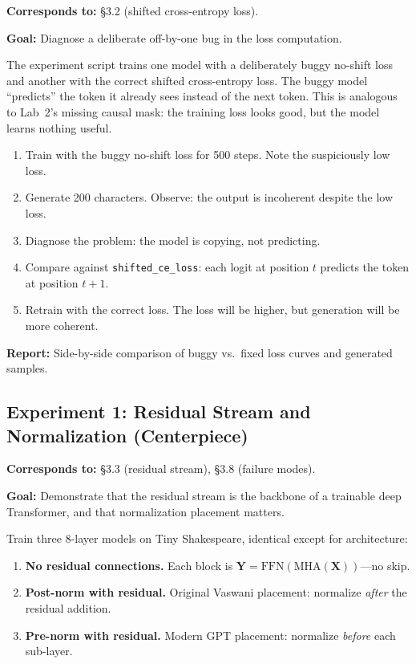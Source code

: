 \textbf{Corresponds to:} \S3.2 (shifted cross-entropy loss).

\textbf{Goal:} Diagnose a deliberate off-by-one bug in the loss computation.

The experiment script trains one model with a deliberately buggy no-shift loss and another with the correct shifted cross-entropy loss. The buggy model ``predicts'' the token it already sees instead of the next token. This is analogous to Lab~2's missing causal mask: the training loss looks good, but the model learns nothing useful.

\begin{enumerate}[nosep]
    \item Train with the buggy no-shift loss for 500 steps. Note the suspiciously low loss.
    \item Generate 200 characters. Observe: the output is incoherent despite the low loss.
    \item Diagnose the problem: the model is copying, not predicting.
    \item Compare against \texttt{shifted\_ce\_loss}: each logit at position $t$ predicts the token at position $t+1$.
    \item Retrain with the correct loss. The loss will be higher, but generation will be more coherent.
\end{enumerate}

\textbf{Report:} Side-by-side comparison of buggy vs.\ fixed loss curves and generated samples.

\subsection*{Experiment 1: Residual Stream and Normalization (Centerpiece)}

\textbf{Corresponds to:} \S3.3 (residual stream), \S3.8 (failure modes).

\textbf{Goal:} Demonstrate that the residual stream is the backbone of a trainable deep Transformer, and that normalization placement matters.

Train three 8-layer models on Tiny Shakespeare, identical except for architecture:

\begin{enumerate}[nosep]
    \item \textbf{No residual connections.} Each block is $\mathbf{Y} = \text{FFN}(\text{MHA}(\mathbf{X}))$---no skip.
    \item \textbf{Post-norm with residual.} Original Vaswani placement: normalize \emph{after} the residual addition.
    \item \textbf{Pre-norm with residual.} Modern GPT placement: normalize \emph{before} each sub-layer.
\end{enumerate}

